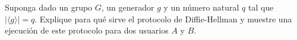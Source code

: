 Suponga dado un grupo $G$, un generador $g$ y un número natural $q$
tal que $|\langle g \rangle| = q$. Explique para qué sirve el
protocolo de Diffie-Hellman y muestre una ejecución de este protocolo
para dos usuarios $A$ y $B$.
